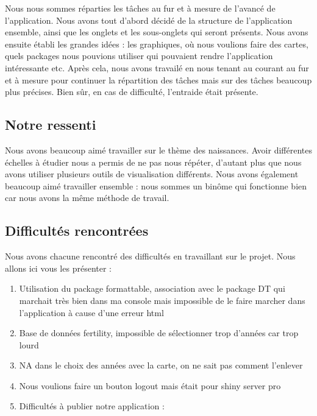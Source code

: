 \documentclass[
]{article}
\providecommand{\tightlist}{%
  \setlength{\itemsep}{0pt}\setlength{\parskip}{0pt}}
\begin{document}
Nous nous sommes réparties les tâches au fur et à mesure de l'avancé de
l'application. Nous avons tout d'abord décidé de la structure de
l'application ensemble, ainsi que les onglets et les sous-onglets qui
seront présents. Nous avons ensuite établi les grandes idées : les
graphiques, où nous voulions faire des cartes, quels packages nous
pouvions utiliser qui pouvaient rendre l'application intéressante etc.
Après cela, nous avons travailé en nous tenant au courant au fur et à
mesure pour continuer la répartition des tâches mais sur des tâches
beaucoup plus précises. Bien sûr, en cas de difficulté, l'entraide était
présente.

\hypertarget{notre-ressenti}{%
\subsection{Notre ressenti}\label{notre-ressenti}}

Nous avons beaucoup aimé travailler sur le thème des naissances. Avoir
différentes échelles à étudier nous a permis de ne pas nous répéter,
d'autant plus que nous avons utiliser plusieurs outils de visualisation
différents. Nous avons également beaucoup aimé travailler ensemble :
nous sommes un binôme qui fonctionne bien car nous avons la même méthode
de travail.

\hypertarget{difficultuxe9s-rencontruxe9es}{%
\subsection{Difficultés
rencontrées}\label{difficultuxe9s-rencontruxe9es}}

Nous avons chacune rencontré des difficultés en travaillant sur le
projet. Nous allons ici vous les présenter :

\begin{enumerate}
\def\labelenumi{\arabic{enumi}.}
\tightlist
\item
  Utilisation du package formattable, association avec le package DT qui
  marchait très bien dans ma console mais impossible de le faire marcher
  dans l'application à cause d'une erreur html
\item
  Base de données fertility, impossible de sélectionner trop d'années
  car trop lourd
\item
  NA dans le choix des années avec la carte, on ne sait pas comment
  l'enlever
\item
  Nous voulions faire un bouton logout mais était pour shiny server pro
\item
  Difficultés à publier notre application :
\end{enumerate}
\end{document}
